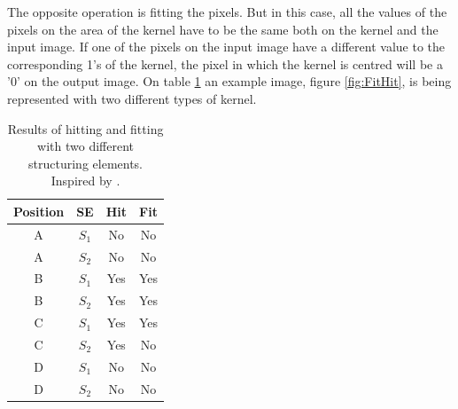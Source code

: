 The opposite operation is fitting the pixels. But in this case, all the values of the pixels on the area of the kernel have to be the same both on the kernel and the input image. If one of the pixels on the input image have a different value to the corresponding 1's of the kernel, the pixel in which the kernel is centred will be a '0' on the output image. On table \ref{tab:HitFitResults} an example image, figure \ref{fig:FitHit}, is being represented with two different types of kernel.
\begin{table}[htbp]
\centering
\begin{tabular}{|c|c|c|c|}
\hline
 \:Position\: &SE &\:\:\:Hit\:\:\: &\:\:\:Fit\:\:\: \\\hline
 \hline
 A &$S_{1}$ &No &No\\\hline
 A &$S_{2}$ &No &No\\\hline
 B &$S_{1}$ &Yes &Yes\\\hline
 B &$S_{2}$ &Yes &Yes\\\hline
 C &$S_{1}$ &Yes &Yes\\\hline
 C &$S_{2}$ &Yes &No\\\hline
 D &$S_{1}$ &No &No\\\hline
 D &$S_{2}$ &No &No\\\hline
\end{tabular}
\caption{Results of hitting and fitting with two different structuring elements. Inspired by \citep{ip_book}.}
\label{tab:HitFitResults}
\end{table}

